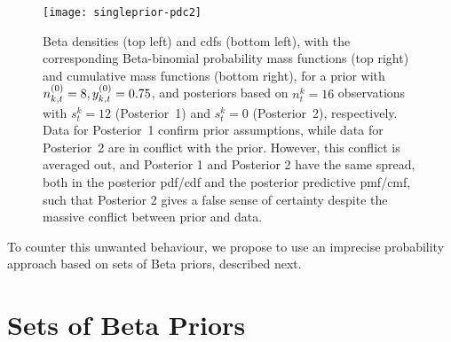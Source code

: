 \documentclass[12pt, a4paper]{elsarticle}
\begin{document}
\begin{figure}
\texttt{[image: singleprior-pdc2]}
\caption{Beta densities (top left) and cdfs (bottom left),
with the corresponding Beta-binomial probability mass functions (top right) and cumulative mass functions (bottom right),
for a prior with $n^{(0)}_{k,t} = 8, y^{(0)}_{k,t} = 0.75$,
and posteriors based on $n^k_t=16$ observations with $s^k_t=12$ (Posterior~1) and $s^k_t=0$ (Posterior~2), respectively.
Data for Posterior~1 confirm prior assumptions,
while data for Posterior~2 are in conflict with the prior.
However, this conflict is averaged out,
and Posterior 1 and Posterior 2 have the same spread, both in the posterior pdf/cdf and the posterior predictive pmf/cmf,
such that Posterior 2 gives a false sense of certainty despite the massive conflict between prior and data.}
\label{fig:singleprior-pdc}
\end{figure}

To counter this unwanted behaviour,
we propose to use an imprecise probability approach
based on sets of Beta priors, described next.


\section{Sets of Beta Priors}
\label{sec:setsofbetapriors}
\end{document}
